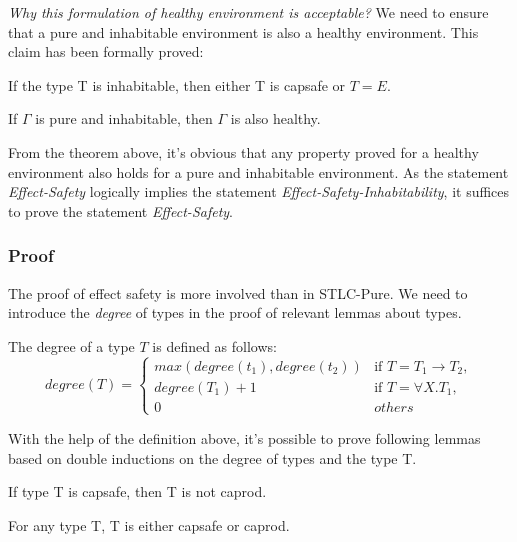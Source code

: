 \emph{Why this formulation of healthy environment is acceptable?} We
need to ensure that a pure and inhabitable environment is also a
healthy environment. This claim has been formally proved:

\begin{theorem}
  If the type T is inhabitable, then either T is capsafe or $T = E$.
\end{theorem}

\begin{theorem}
  If $\Gamma$ is pure and inhabitable, then $\Gamma$ is also healthy.
\end{theorem}

From the theorem above, it's obvious that any property proved for a
healthy environment also holds for a pure and inhabitable
environment. As the statement \emph{Effect-Safety} logically implies
the statement \emph{Effect-Safety-Inhabitability}, it suffices to
prove the statement \emph{Effect-Safety}.

\subsubsection{Proof}

The proof of effect safety is more involved than in STLC-Pure. We need
to introduce the \emph{degree} of types in the proof of
relevant lemmas about types.

\begin{definition}
  The degree of a type $T$ is defined as follows:
  \begin{equation*}
    degree(T) =
    \begin{cases}
      max(degree(t_1), degree(t_2)) & \text{if } T = T_1 \to T_2,\\
      degree(T_1) + 1 & \text{if } T = \forall X.T_1,\\
      0 & others
    \end{cases}
  \end{equation*}
\end{definition}

With the help of the definition above, it's possible to prove
following lemmas based on double inductions on the degree of types and
the type T.

\begin{lemma}
 If type T is capsafe, then T is not caprod.
\end{lemma}

\begin{lemma}
 For any type T, T is either capsafe or caprod.
\end{lemma}

